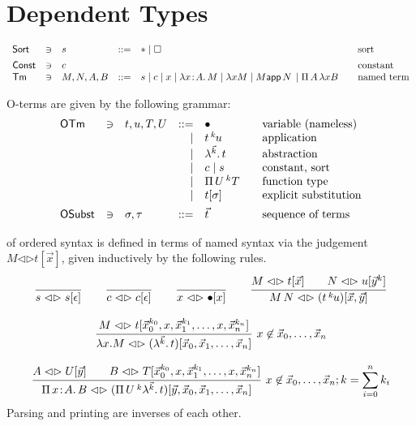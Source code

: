 \documentclass[a4paper]{article}
\newcommand{\OTm}{\mathsf{OTm}}
\newcommand{\OSubst}{\mathsf{OSubst}}
\newcommand{\oann}[1]{{}^{#1}\kern-0.15ex}
\newcommand{\ovar}{\mathord{\bullet}}
\newcommand{\oapp}[1]{\,\oann{#1}}
\newcommand{\olam}[1]{\lambda^{#1}.\,}
\newcommand{\opi}[2]{\Pi\,#1\,^{#2}}
\newcommand{\lrhd}{\mathrel{\mathord{\lhd}\mathord{\rhd}}}
\newcommand{\osyn}[3]{#1 \lrhd \esubst{#2}{#3}}
\newcommand{\osynp}[3]{\osyn{#1}{(#2)}{#3}}
\renewcommand{\esubst}[2]{#1[#2]}
\renewcommand{\funT}[2]{\Pi\,#1\of#2.\,}
\begin{document}
\section{Dependent Types}

\[
\begin{array}{lllrl@{\qquad}l}
\Sort & \ni & s & ::= & \ttype \mid \tkind & \mbox{sort} \\[1ex]
\Const & \ni & c &&& \mbox{constant} \\
\Tm    & \ni & M,N,A,B & ::= & s \mid c \mid x \mid \lam x A M 
  \mid \lambda x M \mid M \app N \mid \Pi\,A\,\lambda x B 
   & \mbox{named term}\\
\end{array}
\]


 O-terms are given by the following grammar:
\[
\begin{array}{lllrl@{\qquad}l}
\OTm & \ni & t,u,T,U & ::= & \ovar & \mbox{variable (nameless)} \\
&&& \mid & t \oapp k u & \mbox{application} \\
&&& \mid & \olam {\vec k} t & \mbox{abstraction} \\
&&& \mid & c \mid s & \mbox{constant, sort} \\
&&& \mid & \opi U k T & \mbox{function type} \\
&&& \mid & \esubst t \sigma & \mbox{explicit substitution} 
\\[1ex]
\OSubst & \ni & \sigma,\tau & ::= & \vec t & \mbox{sequence of terms}\\
\end{array}
\]

 of ordered syntax is defined in terms of named
syntax via the
judgement $\osyn M t {\vec x}$, given inductively by the following rules.
\begin{gather*}
  \ru{}{\osyn s s \epsilon}
\qquad
  \ru{}{\osyn c c \epsilon}
\qquad
  \ru{}{\osyn x \ovar x}
\qquad
  \ru{\osyn M t {\vec x} \qquad 
      \osyn N u {\vec y^k}
    }{\osynp {M\,N} {t \oapp k u} {\vec x, \vec y}}
\\[2ex]
  \rux{\osyn M t {\vec x_0^{k_0},x,\vec x_1^{k_1},\dots,x,\vec x_n^{k_n}}
     }{\osynp {\lambda x.M} {\olam {\vec k} t}
         {\vec x_0,\vec x_1,\dots,\vec x_n}
    }{x \not\in \vec x_0,\dots,\vec x_n}
\\[2ex]
  \rux{\osyn A U {\vec y} \qquad
       \osyn B T {\vec x_0^{k_0},x,\vec x_1^{k_1},\dots,x,\vec x_n^{k_n}}
     }{\osynp {\funT x A B} {\opi U k {\olam {\vec k} t}}
         {\vec y,\vec x_0,\vec x_1,\dots,\vec x_n}
     }{x \not\in \vec x_0,\dots,\vec x_n; 
       k = \sum_{i=0}^n k_i}
\end{gather*}
Parsing and printing are inverses of each other.
\end{document}

